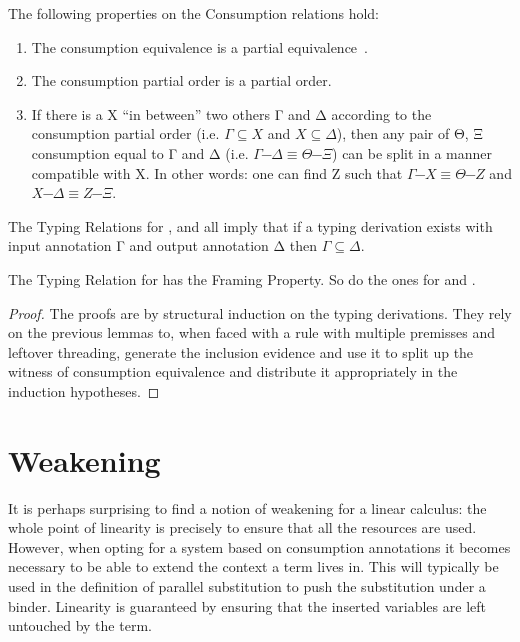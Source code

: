 \begin{lemma} The following properties on the Consumption relations hold:
\begin{enumerate}
  \item The consumption equivalence is a partial equivalence~\cite{mitchell1996foundations}.
  \item The consumption partial order is a partial order.
  \item If there is a \Usages{} Χ ``in between'' two others Γ and Δ according to
        the consumption partial order (i.e. $Γ ⊆ Χ$ and $Χ ⊆ Δ$), then any pair
        of \Usages{} Θ, Ξ consumption equal to Γ and Δ (i.e. \mbox{$Γ ─ Δ ≡ Θ ─ Ξ$})
        can be split in a manner compatible with Χ. In other words: one can find
        Ζ such that \mbox{$Γ ─ Χ ≡ Θ ─ Ζ$} and \mbox{$Χ ─ Δ ≡ Ζ ─ Ξ$}.
\end{enumerate}
\end{lemma}

\begin{lemma}[Consumption]The Typing Relations for \Var{}, \Inferable{}
and \Checkable{} all imply that if a typing derivation exists with input
\Usages{} annotation Γ and output \Usages{} annotation Δ then $Γ ⊆ Δ$.\label{lemma:consumption}
\end{lemma}

\begin{theorem}
\label{theorem:framing}
The Typing Relation for \Var{} has the Framing Property.
So do the ones for \Inferable{} and \Checkable{}.
\end{theorem}
\begin{proof}
The proofs are by structural induction on the typing derivations. They rely on
the previous lemmas to, when faced with a rule with multiple premisses and leftover
threading, generate the inclusion evidence and use it to split up the witness
of consumption equivalence and distribute it appropriately in the induction hypotheses.
\end{proof}


\section{Weakening}\label{sec:weakening}

It is perhaps surprising to find a notion of weakening for a linear
calculus: the whole point of linearity is precisely to ensure that
all the resources are used. However, when opting for a system based
on consumption annotations it becomes necessary to be able to extend
the context a term lives in. This will typically be used in the definition
of parallel substitution to push the substitution under a binder. Linearity
is guaranteed by ensuring that the inserted variables are left untouched by
the term.

